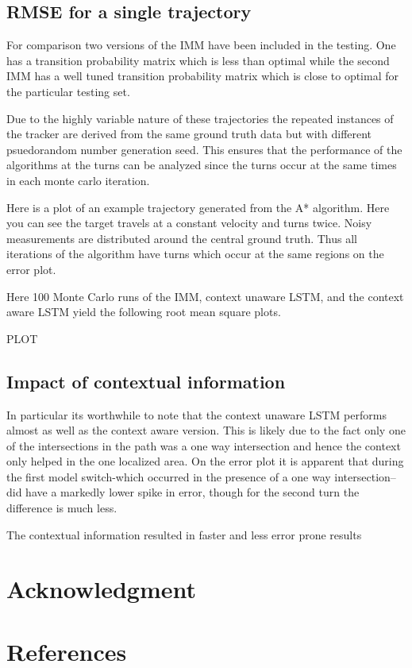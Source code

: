 \documentclass[twocolumn,letterpaper]{IEEEAerospaceCLS}  %
\begin{document}
\subsection{RMSE for a single trajectory}
For comparison two versions of the IMM have been included in the testing. One has a transition probability matrix which is less than optimal while the second IMM has a well tuned transition probability matrix which is close to optimal for the particular testing set.

Due to the highly variable nature of these trajectories the repeated instances of the tracker are derived from the same ground truth data but with different psuedorandom number generation seed. This ensures that the performance of the algorithms at the turns can be analyzed since the turns occur at the same times in each monte carlo iteration.

Here is a plot of an example trajectory generated from the A* algorithm. Here you can see the target travels at a constant velocity and turns twice. Noisy measurements are distributed around the central ground truth. Thus all iterations of the algorithm have turns which occur at the same regions on the error plot.

Here 100 Monte Carlo runs of the IMM, context unaware LSTM, and the context aware LSTM yield the following root mean square plots.

PLOT


\subsection{Impact of contextual information}
In particular its worthwhile to note that the context unaware LSTM performs almost as well as the context aware version. This is likely due to the fact only one of the intersections in the path was a one way intersection and hence the context only helped in the one localized area. On the error plot it is apparent that during the first model switch-which occurred in the presence of a one way intersection-- did have a markedly lower spike in error, though for the second turn the difference is much less.

The contextual information resulted in faster and less error prone results


\section*{Acknowledgment}


\section*{References}
\end{document}
